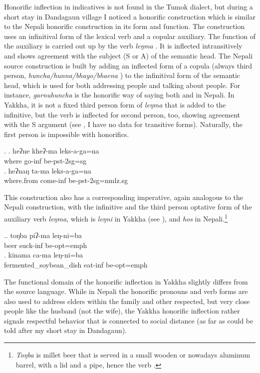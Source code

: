 Honorific inflection in indicatives is not found in the Tumok dialect, but during a short stay in Dandagaun  village I noticed a honorific construction which is similar to the Nepali honorific construction  in its form and function. The construction uses an infinitival form of the lexical verb and a copular auxiliary. The function of the auxiliary is carried out up by the verb \emph{leŋma} . It is inflected intransitively  and shows agreement with the subject (S or A) of the semantic head.  The Nepali source construction is built by adding an inflected form of a copula (always third person, \emph{huncha/hunna/bhayo/bhaena} ) to the infinitival form of the semantic head, which is used for both addressing people and talking about people. For instance, \emph{garnuhuncha} is the honorific way of saying both  and  in Nepali. In Yakkha, it is not a fixed third person form of \emph{leŋma} that is added to the infinitive, but the verb is inflected for second person, too, showing agreement with the S argument (see \Next, I have no data for transitive forms). Naturally, the first person is  impossible with honorifics. 

\ex. \ag. heʔne kheʔ-ma leks-a-ga=na\\
where go-{\sc inf} be-{\sc pst-2sg=sg}\\
\bg. heʔnaŋ ta-ma leks-a-ga=na\\
where.from come-{\sc inf} be-{\sc pst-2sg=nmlz.sg}\\

This construction also has a corresponding imperative, again analogous to the Nepali construction, with the infinitive and the third person optative form of the auxiliary verb  \emph{leŋma}, which is  \emph{leŋni} in Yakkha (see \Next), and \emph{hos} in Nepali.\footnote{\emph{Toŋba} is millet beer that is served in a small wooden or nowadays aluminum barrel, with a lid and a pipe, hence the verb .}

\ex.\ag. toŋba piʔ-ma leŋ-ni=ba\\
beer{\sc } suck-{\sc inf} be{\sc [3sg]-opt=emph}\\
\bg. kinama ca-ma leŋ-ni=ba\\
fermented\_soybean\_dish eat-{\sc inf} be{\sc [3sg]-opt=emph}\\

The functional domain of the honorific inflection in Yakkha slightly differs from the source language. While in Nepali the honorific pronouns and verb forms are also used to address elders within the family and other respected, but very close people like the husband (not the wife), the Yakkha  honorific inflection rather signals respectful behavior that is connected to social distance (as far as could be told after my short stay in Dandagaun).


